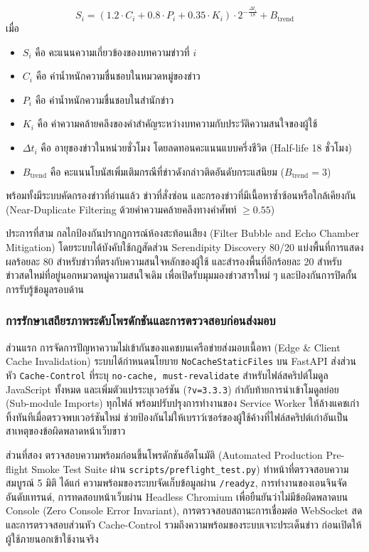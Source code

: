 \begin{equation}
\label{eq_for_you_score}
S_i = \left( 1.2 \cdot C_i + 0.8 \cdot P_i + 0.35 \cdot K_i \right) \cdot 2^{-\frac{\Delta t_i}{18}} + B_{\text{trend}}
\end{equation}
เมื่อ
\begin{itemize}[noitemsep,topsep=0pt]
    \item $S_i$ คือ คะแนนความเกี่ยวข้องของบทความข่าวที่ $i$
    \item $C_i$ คือ ค่าน้ำหนักความชื่นชอบในหมวดหมู่ของข่าว
    \item $P_i$ คือ ค่าน้ำหนักความชื่นชอบในสำนักข่าว
    \item $K_i$ คือ ค่าความคล้ายคลึงของคำสำคัญระหว่างบทความกับประวัติความสนใจของผู้ใช้
    \item $\Delta t_i$ คือ อายุของข่าวในหน่วยชั่วโมง โดยลดทอนคะแนนแบบครึ่งชีวิต (Half-life 18 ชั่วโมง)
    \item $B_{\text{trend}}$ คือ คะแนนโบนัสเพิ่มเติมกรณีที่ข่าวดังกล่าวติดอันดับกระแสนิยม ($B_{\text{trend}} = 3$)
\end{itemize}
พร้อมทั้งมีระบบคัดกรองข่าวที่อ่านแล้ว ข่าวที่สั่งซ่อน และกรองข่าวที่มีเนื้อหาซ้ำซ้อนหรือใกล้เคียงกัน (Near-Duplicate Filtering ด้วยค่าความคล้ายคลึงทางคำศัพท์ $\ge 0.55$)

ประการที่สาม กลไกป้องกันปรากฏการณ์ห้องสะท้อนเสียง (Filter Bubble and Echo Chamber Mitigation) โดยระบบได้บังคับใช้กฎสัดส่วน Serendipity Discovery 80/20 แบ่งพื้นที่การแสดงผลร้อยละ 80 สำหรับข่าวที่ตรงกับความสนใจหลักของผู้ใช้ และสำรองพื้นที่อีกร้อยละ 20 สำหรับข่าวสดใหม่ที่อยู่นอกหมวดหมู่ความสนใจเดิม เพื่อเปิดรับมุมมองข่าวสารใหม่ ๆ และป้องกันการปิดกั้นการรับรู้ข้อมูลรอบด้าน

\subsubsection{การรักษาเสถียรภาพระดับโพรดักชันและการตรวจสอบก่อนส่งมอบ}
ส่วนแรก การจัดการปัญหาความไม่เข้ากันของแคชบนเครือข่ายส่งมอบเนื้อหา (Edge \& Client Cache Invalidation) ระบบได้กำหนดนโยบาย \texttt{NoCacheStaticFiles} บน FastAPI ส่งส่วนหัว \texttt{Cache-Control} ที่ระบุ \texttt{no-cache, must-revalidate} สำหรับไฟล์สคริปต์โมดูล JavaScript ทั้งหมด และเพิ่มตัวแปรระบุเวอร์ชัน (\texttt{?v=3.3.3}) กำกับท้ายการนำเข้าโมดูลย่อย (Sub-module Imports) ทุกไฟล์ พร้อมปรับปรุงการทำงานของ Service Worker ให้ล้างแคชเก่าทิ้งทันทีเมื่อตรวจพบเวอร์ชันใหม่ ช่วยป้องกันไม่ให้เบราว์เซอร์ของผู้ใช้ค้างที่ไฟล์สคริปต์เก่าอันเป็นสาเหตุของข้อผิดพลาดหน้าเว็บขาว

ส่วนที่สอง ตรวจสอบความพร้อมก่อนขึ้นโพรดักชันอัตโนมัติ (Automated Production Pre-flight Smoke Test Suite ผ่าน \texttt{scripts/preflight\_test.py}) ทำหน้าที่ตรวจสอบความสมบูรณ์ 5 มิติ ได้แก่ ความพร้อมของระบบจัดเก็บข้อมูลผ่าน \texttt{/readyz}, การทำงานของเอนจินจัดอันดับเทรนด์, การทดสอบหน้าเว็บผ่าน Headless Chromium เพื่อยืนยันว่าไม่มีข้อผิดพลาดบน Console (Zero Console Error Invariant), การตรวจสอบสถานะการเชื่อมต่อ WebSocket สด และการตรวจสอบส่วนหัว Cache-Control รวมถึงความพร้อมของระบบเจาะประเด็นข่าว ก่อนเปิดให้ผู้ใช้ภายนอกเข้าใช้งานจริง

